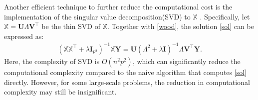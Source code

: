 \documentclass[preprint,authoryear,11pt]{elsarticle}
\newcommand{\bI}{\mathbf I}
\newcommand{\Y}{\mathbf Y}
\newcommand{\bU}{\mathbf U}
\newcommand{\bV}{\mathbf V}
\newcommand{\cX}{\mathbb {X}}
\newcommand{\trans}{^\top}
\begin{document}
 Another efficient technique to further reduce the computational cost is the  implementation of the singular value decomposition(SVD) to $\cX$ \citep{haris2016convex}.  Specifically, let $\cX = \bU \Lambda \bV \trans$ be the thin SVD of $\cX$. Together with \eqref{wood}, the solution \eqref{sol} can be expressed as:
\begin{align} \label{svd}
	(\cX \cX \trans+\lambda   \bI_{p^2})^{-1}\cX  \Y=\bU (\Lambda^2+\lambda \bI)^{-1} \Lambda \bV \trans \Y.
\end{align}
Here, the complexity of SVD is $O(n^2p^2)$, which can significantly reduce the computational complexity compared to the naive algorithm that computes \eqref{sol} directly. However, for some large-scale problems, the reduction in computational complexity may still be insignificant.

 
\end{document}
